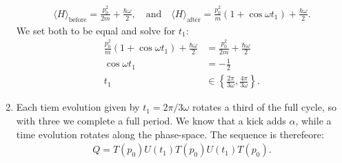 \documentclass[letterpaper,11pt,twoside]{article}
\newcommand{\braket}[1]{\langle#1\rangle}
\begin{document}
\begin{enumerate}[itemsep=0pt,topsep=0pt,label=\alph*)]
  \begin{align*}
    \braket{H}_{\text{before}}=\frac{p_0^2}{2m}+\frac{\hbar\omega}{2},\quad\text{and}\quad\braket{H}_{\text{after}}=\frac{p^2_0}{m}(1+\cos\omega t_1)+\frac{\hbar\omega}{2}.
  \end{align*}
  We set both to be equal and solve for $t_1$:
  \begin{align*}
    \frac{p^2_0}{m}(1+\cos\omega t_1)+\frac{\hbar\omega}{2}&=\frac{p_0^2}{2m}+\frac{\hbar\omega}{2}\\
    \cos\omega t_1&=-\frac{1}{2}\\
    t_1&\in\left\{\frac{2\pi}{3\omega},\frac{4\pi}{3\omega}\right\}.
  \end{align*}
  \item Each tiem evolution given by $t_1=2\pi/3\omega$ rotates a third of the full cycle, so with three we complete a full period. We know that a kick adds $\alpha$, while a time evolution 
  rotates along the phase-space. The sequence is therefeore:
  \begin{align*}
    Q=T(p_0)U(t_1)T(p_0)U(t_1)T(p_0).
  \end{align*}
\end{enumerate}


\end{document}
